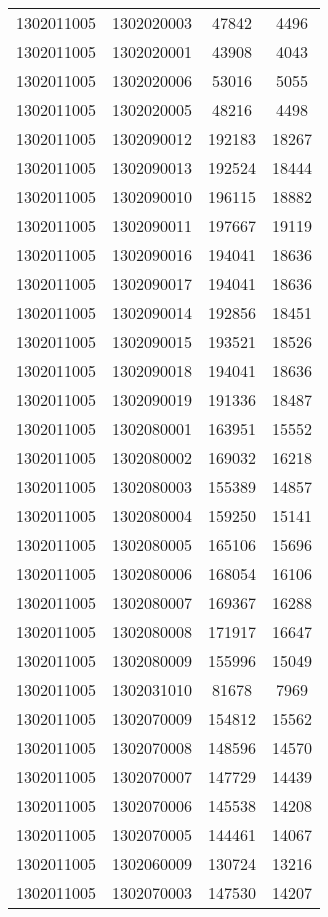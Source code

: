 \begin{longtable}[h]{llcc}
		1302011005 & 1302020003 & 47842 & 4496\\
		1302011005 & 1302020001 & 43908 & 4043\\
		1302011005 & 1302020006 & 53016 & 5055\\
		1302011005 & 1302020005 & 48216 & 4498\\
		1302011005 & 1302090012 & 192183 & 18267\\
		1302011005 & 1302090013 & 192524 & 18444\\
		1302011005 & 1302090010 & 196115 & 18882\\
		1302011005 & 1302090011 & 197667 & 19119\\
		1302011005 & 1302090016 & 194041 & 18636\\
		1302011005 & 1302090017 & 194041 & 18636\\
		1302011005 & 1302090014 & 192856 & 18451\\
		1302011005 & 1302090015 & 193521 & 18526\\
		1302011005 & 1302090018 & 194041 & 18636\\
		1302011005 & 1302090019 & 191336 & 18487\\
		1302011005 & 1302080001 & 163951 & 15552\\
		1302011005 & 1302080002 & 169032 & 16218\\
		1302011005 & 1302080003 & 155389 & 14857\\
		1302011005 & 1302080004 & 159250 & 15141\\
		1302011005 & 1302080005 & 165106 & 15696\\
		1302011005 & 1302080006 & 168054 & 16106\\
		1302011005 & 1302080007 & 169367 & 16288\\
		1302011005 & 1302080008 & 171917 & 16647\\
		1302011005 & 1302080009 & 155996 & 15049\\
		1302011005 & 1302031010 & 81678 & 7969\\
		1302011005 & 1302070009 & 154812 & 15562\\
		1302011005 & 1302070008 & 148596 & 14570\\
		1302011005 & 1302070007 & 147729 & 14439\\
		1302011005 & 1302070006 & 145538 & 14208\\
		1302011005 & 1302070005 & 144461 & 14067\\
		1302011005 & 1302060009 & 130724 & 13216\\
		1302011005 & 1302070003 & 147530 & 14207\\

\end{longtable}
